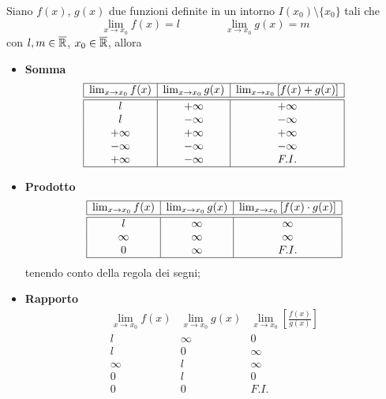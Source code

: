 \begin{shadedTheorem}
    Siano $f(x)$, $g(x)$ due funzioni definite in un intorno $I(x_0)\setminus \{x_0\}$ tali che
        \[\lim_{x\to x_0}f(x)=l\qquad \qquad \lim_{x\to x_0}g(x)=m\]
        con $l,m\in \overline{\mathbb{R}}$, $x_0\in \overline{\mathbb{R}}$, allora\\
        \begin{itemize}
            \item \textbf{Somma}
            \[\begin{array}{|c|c|c|}
                \hline
                \lim_{x\to x_0}f(x)& \lim_{x\to x_0}g(x)& \lim_{x\to x_0}\left[ f(x)+g(x) \right] \\ \hline\hline
                l & +\infty & +\infty\\
                l & -\infty & -\infty\\
                +\infty & +\infty & +\infty\\
                -\infty & -\infty & -\infty\\
                +\infty & -\infty & F. I. \\\hline
            \end{array}\]
            \item \textbf{Prodotto}
            \[\begin{array}{|c|c|c|}
                \hline
                \lim_{x\to x_0}f(x)& \lim_{x\to x_0}g(x)& \lim_{x\to x_0}\left[ f(x)\cdot g(x) \right] \\ \hline\hline
                l & \infty & \infty\\
                \infty & \infty & \infty\\
                0 & \infty & F. I. \\\hline
            \end{array}\]
            tenendo conto della regola dei segni;
            \item \textbf{Rapporto}
            \[\begin{array}{|c|c|c|}
                \hline
                \lim_{x\to x_0}f(x)& \lim_{x\to x_0}g(x)& \lim_{x\to x_0}\left[ \frac{f(x)}{g(x)} \right] \\ \hline\hline
                l & \infty & 0\\
                l &  0 &\infty \\
                \infty & l & \infty\\
                0 & l & 0\\
                0 & 0 & F. I. \\

\end{array}\]
\end{itemize}
\end{shadedTheorem}
